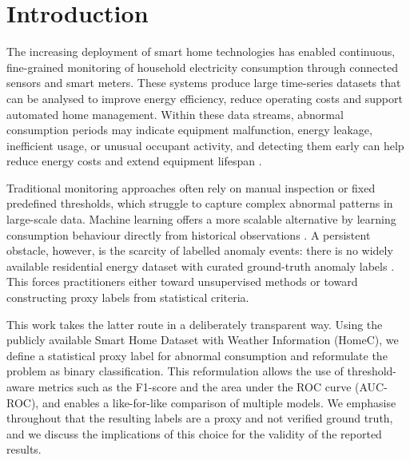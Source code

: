 \documentclass[pdflatex,sn-mathphys-num]{sn-jnl}%
\theoremstyle{thmstyleone}%
\theoremstyle{thmstyletwo}%
\theoremstyle{thmstylethree}%
\begin{document}

\maketitle

\section{Introduction}\label{sec1}

The increasing deployment of smart home technologies has enabled continuous, fine-grained monitoring of household electricity consumption through connected sensors and smart meters. These systems produce large time-series datasets that can be analysed to improve energy efficiency, reduce operating costs and support automated home management. Within these data streams, abnormal consumption periods may indicate equipment malfunction, energy leakage, inefficient usage, or unusual occupant activity, and detecting them early can help reduce energy costs and extend equipment lifespan \cite{himeur2021}.

Traditional monitoring approaches often rely on manual inspection or fixed predefined thresholds, which struggle to capture complex abnormal patterns in large-scale data. Machine learning offers a more scalable alternative by learning consumption behaviour directly from historical observations \cite{ambat2025}. A persistent obstacle, however, is the scarcity of labelled anomaly events: there is no widely available residential energy dataset with curated ground-truth anomaly labels \cite{ambat2025}. This forces practitioners either toward unsupervised methods or toward constructing proxy labels from statistical criteria.

This work takes the latter route in a deliberately transparent way. Using the publicly available Smart Home Dataset with Weather Information (HomeC), we define a statistical proxy label for abnormal consumption and reformulate the problem as binary classification. This reformulation allows the use of threshold-aware metrics such as the F1-score and the area under the ROC curve (AUC-ROC), and enables a like-for-like comparison of multiple models. We emphasise throughout that the resulting labels are a proxy and not verified ground truth, and we discuss the implications of this choice for the validity of the reported results.
\end{document}
